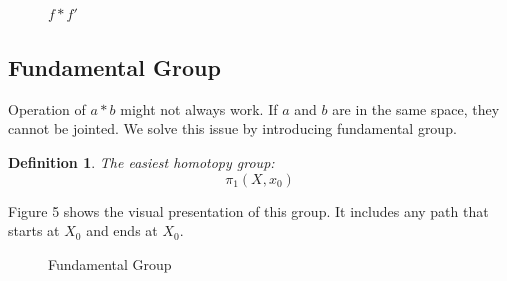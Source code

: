 \documentclass[12pt,letterpaper]{article}
\newtheorem{mydef}{Definition}
\begin{document}
\begin{normalsize}
\begin{figure}[hbt!]
\begin{center}
\caption{$f \ast f'$}
    \label{fig:my_label}
        
\end{center}

\end{figure}


\subsection{Fundamental Group}
Operation of $a \ast b$ might not always work. If $a$ and $b$ are in the same space, they cannot be jointed. We solve this issue by introducing fundamental group. 
\begin{mydef}\label{def:def444} 
 The easiest homotopy group: \\
        $$\pi_1(X,x_0)$$
\end{mydef}
Figure 5 shows the visual presentation of this group. It includes any path that starts at $X_0$ and ends at $X_0$.
\begin{figure}[hbt!]
\begin{center}

\caption{Fundamental Group}
    \label{fig:my_label}
        
\end{center}
\end{figure}

\end{normalsize}
\end{document}
